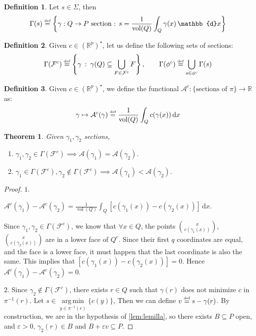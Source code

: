\documentclass[10pt,a4paper]{article}
\DeclareMathOperator{\vol}{vol}
\DeclareMathOperator*{\argmin}{arg\,min}
\def\defs{\stackrel{\tiny{\mbox{def}}}{=}}		%
\newcommand{\RR}{\mathbb{R}}
\newcommand{\eps}{\varepsilon}
\theoremstyle{plain}
\newtheorem{theorem}{Theorem}
\theoremstyle{remark}
\theoremstyle{definition}
\newtheorem{definition}{Definition}
\begin{document}
\begin{definition}
	Let $s\in\Sigma$, then
	\begin{equation}
	\Gamma(s)\defs \left\{\gamma:Q\to P \mbox{ section : } 
	s = \frac{1}{\vol(Q)}\int_Q\gamma(x) \,\mathbb{d}x \right\}
	\end{equation}
\end{definition}
\begin{definition}
	Given $c\in(\RR^p)^\star$, let us define the following sets of sections:
	\begin{equation}
	\Gamma(\mathcal{F}^c) \defs 
	\left\{ \gamma\::\: \gamma(Q)\subseteq \bigcup_{F\in \mathcal{F}^c} F \right\}, \qquad
	\Gamma(\phi^c) \defs 
	\bigcup_{s\in\phi^c} \Gamma(s) 
	\end{equation}
\end{definition}
\begin{definition}
	Given $c\in(\RR^p)^\star$, we define the functional 
	$\mathcal{A}^c:\{\mbox{sections of } \pi \} \to \RR$ as:
	\begin{equation}
	\gamma \mapsto \mathcal{A}^c(\gamma) 
	\defs \frac1{\vol(Q)} \int_Q c(\gamma(x))\,\mbox{d}x
	\end{equation}
\end{definition}
\begin{theorem}
	Given $\gamma_1,\gamma_2$ sections, 
	\begin{enumerate}
		\item $\gamma_1,\gamma_2\in\Gamma(\mathcal{F}^c) 
		\implies  \mathcal{A}(\gamma_1) = \mathcal{A}( \gamma_2)$.
		\item $\gamma_1\in\Gamma(\mathcal{F}^c), \gamma_2\notin\Gamma(\mathcal{F}^c)
		\implies \mathcal{A}(\gamma_1) < \mathcal{A}( \gamma_2)$.
	\end{enumerate}
\end{theorem}
\begin{proof}
	$\boxed{1.}$
	
	$\mathcal{A}^c(\gamma_1)-\mathcal{A}^c(\gamma_2) = 
	\frac1{\vol(Q)}\int_Q [c(\gamma_1(x)) - c(\gamma_2(x))]\,\mathrm{d}x$.
	
	Since $\gamma_1,\gamma_2\in\Gamma(\mathcal{F}^c)$,
	we know that $\forall x\in Q$, 
	the points $\binom{x}{c(\gamma_1(x))}$, $\binom{x}{c(\gamma_2(x))}$ 
	are in a lower face of $Q^c$. 
	Since their first $q$ coordinates are equal, and the face is a lower face, 
	it must happen that the last coordinate is also the same. 
	This implies that $[c(\gamma_1(x)) - c(\gamma_2(x))] = 0$.
	Hence $\mathcal{A}^c(\gamma_1)-\mathcal{A}^c(\gamma_2) = 0$.
	
	$\boxed{2. }$
	Since $\gamma_2\notin\Gamma(\mathcal{F}^c)$, 
	there exists $r\in Q$ such that $\gamma(r)$ does not minimize $c$ in $\pi^{-1}(r)$. 
	Let $s \in \argmin\limits_{y\in\pi^{-1}(r)}\{c(y)\}$,
	Then we can define $v\defs s - \gamma(r)$. 
	By construction, we are in the hypothesis of \cref{lem:lemilla}, 
	so there exists $B\subseteq P$ open, and $\eps > 0$, 
	$\gamma_2(r)\in B$ and $B+\eps v \subseteq P$.
\end{proof}
\end{document}
